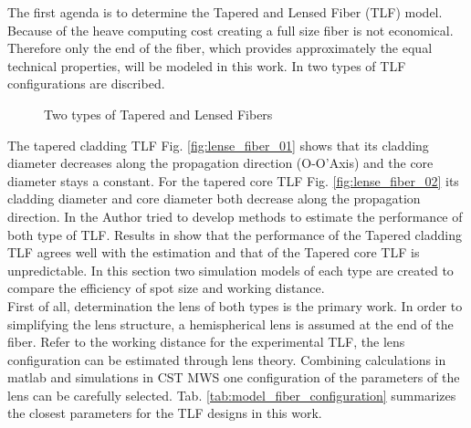
The first agenda is to determine the Tapered and Lensed Fiber (TLF) model. Because of the heave computing cost creating a full size fiber is not economical. Therefore only the end of the fiber, which provides approximately the equal technical properties, will be modeled in this work. In \cite{TLF_analysis,TLF_mode_transforming} two types of TLF configurations are discribed. 


\begin{figure}[!ht]
\centering
{}
\hfill
{}
\label{fig:two_TLF}
\caption{Two types of Tapered and Lensed Fibers}
\end{figure}

The tapered cladding TLF Fig. \ref{fig:lense_fiber_01} shows that its cladding diameter decreases along the propagation direction (O-O'Axis) and the core diameter stays a constant. For the tapered core TLF Fig. \ref{fig:lense_fiber_02} its cladding diameter and core diameter both decrease along the propagation direction. In \cite{TLF_mode_transforming} the Author tried to develop methods to estimate the performance of both type of TLF. Results in \cite{TLF_mode_transforming} show that the performance of the Tapered cladding TLF agrees well with the estimation and that of the Tapered core TLF is unpredictable. In this section two simulation models of each type are created to compare the efficiency of spot size and working distance.\\  
First of all, determination the lens of both types is the primary work. In order to simplifying the lens structure, a hemispherical lens is assumed at the end of the fiber. Refer to the working distance for the experimental TLF, the lens configuration can be estimated through lens theory. Combining calculations in matlab and simulations in CST MWS one configuration of the parameters of the lens can be carefully selected. Tab. \ref{tab:model_fiber_configuration} summarizes the closest parameters for the TLF designs in this work.   

